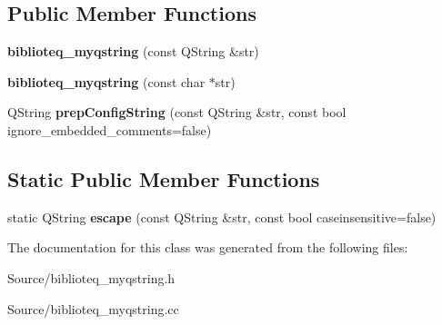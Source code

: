 \subsection*{Public Member Functions}
\begin{DoxyCompactItemize}
\item 
{\bfseries biblioteq\+\_\+myqstring} (const Q\+String \&str)\hypertarget{classbiblioteq__myqstring_a06f0be4a9667fcd7515f887a8b222b57}{}\label{classbiblioteq__myqstring_a06f0be4a9667fcd7515f887a8b222b57}

\item 
{\bfseries biblioteq\+\_\+myqstring} (const char $\ast$str)\hypertarget{classbiblioteq__myqstring_a7bd6dee31493267f2c572be90b47a9da}{}\label{classbiblioteq__myqstring_a7bd6dee31493267f2c572be90b47a9da}

\item 
Q\+String {\bfseries prep\+Config\+String} (const Q\+String \&str, const bool ignore\+\_\+embedded\+\_\+comments=false)\hypertarget{classbiblioteq__myqstring_a240020e58b9711e8febb705dfc80fb4a}{}\label{classbiblioteq__myqstring_a240020e58b9711e8febb705dfc80fb4a}

\end{DoxyCompactItemize}
\subsection*{Static Public Member Functions}
\begin{DoxyCompactItemize}
\item 
static Q\+String {\bfseries escape} (const Q\+String \&str, const bool caseinsensitive=false)\hypertarget{classbiblioteq__myqstring_ad129d813b76e4393b4ca39c7d210a672}{}\label{classbiblioteq__myqstring_ad129d813b76e4393b4ca39c7d210a672}

\end{DoxyCompactItemize}


The documentation for this class was generated from the following files\+:\begin{DoxyCompactItemize}
\item 
Source/biblioteq\+\_\+myqstring.\+h\item 
Source/biblioteq\+\_\+myqstring.\+cc\end{DoxyCompactItemize}
